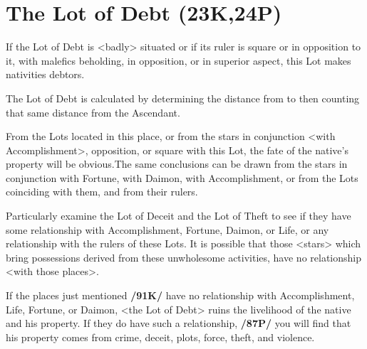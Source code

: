 \section{The Lot of Debt (23K,24P)}


If the Lot of Debt is <badly> situated or if its ruler is square or in opposition to it, with malefics beholding, in opposition, or in superior aspect, this Lot makes nativities debtors. 

The Lot of Debt is calculated  by determining the distance from \Mercury\xspace to \Saturn\xspace then counting that same distance from the Ascendant. 

From the Lots located in this place, or from the stars in conjunction <with Accomplishment>, opposition, or square with this Lot, the fate of the native’s property will be obvious.\mndl The same conclusions can be drawn from the stars in conjunction with Fortune, with Daimon, with Accomplishment,
or from the Lots coinciding with them, and from their rulers.

Particularly examine the Lot of Deceit and the Lot of Theft to see if they have some relationship with Accomplishment, Fortune, Daimon, or Life, or any relationship with the rulers of these Lots. It is possible that those <stars> which bring possessions derived from these unwholesome activities, have no relationship <with those places>. 

If the places just mentioned \textbf{/91K/} have no relationship with Accomplishment, Life, Fortune, or Daimon, <the Lot of Debt> ruins the livelihood of the native and his property. If they do have such a relationship, \textbf{/87P/} you will find that his property comes from crime, deceit, plots, force, theft, and violence.

\newpage